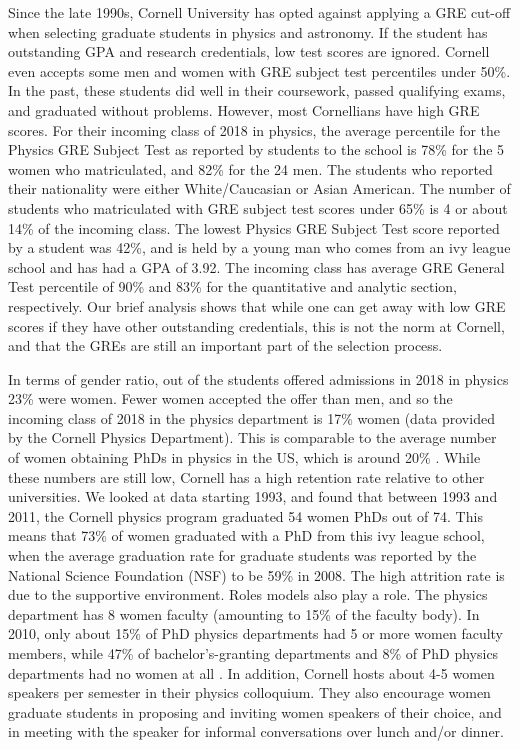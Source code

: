 \documentclass[utf8]{frontiersSCNS} %
\begin{document}
Since the late 1990s, Cornell University has opted against applying a GRE cut-off when selecting graduate students in physics and astronomy. If the student has outstanding GPA and research credentials, low test scores are ignored.  Cornell even accepts some men and women with GRE subject test percentiles under 50\%.  In the past, these students did well in their coursework, passed qualifying exams, and graduated without problems. However, most Cornellians have high GRE scores. For their incoming class of 2018 in physics, the average percentile for the Physics GRE Subject Test as reported by students to the school is 78\% for the 5 women who matriculated, and 82\% for the 24 men. The students who reported their nationality were either White/Caucasian or Asian American. The number of students who matriculated with GRE subject test scores under 65\% is 4 or about 14\% of the incoming class. The lowest Physics GRE Subject Test score reported by a student was 42\%, and is held by a young man who comes from an ivy league school and has had a GPA of 3.92. The incoming class has average GRE General Test percentile of 90\% and 83\% for the quantitative and analytic section, respectively. Our brief analysis shows that while one can get away with low GRE scores if they have other outstanding credentials, this is not the norm at Cornell, and that the GREs are still an important part of the selection process.

In terms of gender ratio, out of the students offered admissions in 2018 in physics 23\% were women. Fewer women accepted the offer than men, and so the incoming class of 2018 in the physics department is 17\% women (data provided by the Cornell Physics Department). This is comparable to the average number of women obtaining PhDs in physics in the US, which is around 20\% \citep{apsData}. While these numbers are still low, Cornell has a high retention rate relative to other universities. We looked at data starting 1993, and found that between 1993 and 2011, the Cornell physics program graduated 54 women PhDs out of 74. This means that 73\% of women graduated with a PhD from this ivy league school, when the average graduation rate for graduate students was reported by the National Science Foundation (NSF) to be 59\% in 2008. The high attrition rate is due to the supportive environment. Roles models also play a role. The physics department has 8 women faculty (amounting to 15\% of the faculty body). In 2010, only about 15\% of PhD physics departments had 5 or more women faculty members, while 47\% of  bachelor’s-granting departments and 8\% of PhD physics departments had no women at all \citep{ivie2013women}. In addition, Cornell hosts about 4-5 women speakers per semester in their physics colloquium. They also encourage women graduate students in proposing and inviting women speakers of their choice, and in meeting with the speaker for informal conversations over lunch and/or dinner. 
\end{document}
